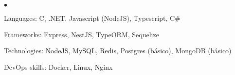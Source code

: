 \documentclass[margin,line]{res}
\newenvironment{list2}{
 \begin{list}{$\bullet$}{%
     \setlength{\itemsep}{0in}
     \setlength{\parsep}{0in} \setlength{\parskip}{0in}
     \setlength{\topsep}{0in} \setlength{\partopsep}{0in}
     \setlength{\leftmargin}{0.2in}}}{\end{list}}
\begin{document}
\begin{resume}
\begin{list2}
\item Languages: C, .NET, Javascript (NodeJS), Typescript, C\#

\item Frameworks: Express, NestJS, TypeORM, Sequelize

\item Technologies: NodeJS, MySQL, Redis, Postgres (básico), MongoDB (básico)

\item DevOps skills: Docker, Linux, Nginx
\end{list2}
\end{resume}
\end{document}
